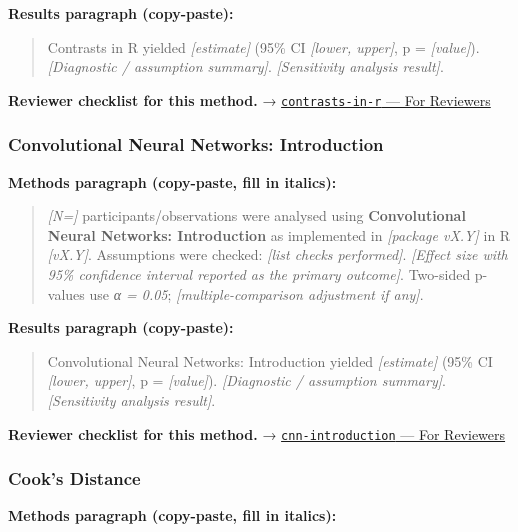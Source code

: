 \documentclass[
]{article}
\begin{document}
\textbf{Results paragraph (copy-paste):}

\begin{quote}
Contrasts in R yielded \emph{{[}estimate{]}} (95\% CI \emph{{[}lower,
upper{]}}, p = \emph{{[}value{]}}). \emph{{[}Diagnostic / assumption
summary{]}}. \emph{{[}Sensitivity analysis result{]}}.
\end{quote}

\textbf{Reviewer checklist for this method.} →
\href{../chapters/07-regression/contrasts-in-r.Rmd\#for-reviewers}{\texttt{contrasts-in-r}
--- For Reviewers}

\subsubsection{Convolutional Neural Networks:
Introduction}\label{convolutional-neural-networks-introduction}

\textbf{Methods paragraph (copy-paste, fill in italics):}

\begin{quote}
\emph{{[}N={]}} participants/observations were analysed using
\textbf{Convolutional Neural Networks: Introduction} as implemented in
\emph{{[}package vX.Y{]}} in R \emph{{[}vX.Y{]}}. Assumptions were
checked: \emph{{[}list checks performed{]}}. \emph{{[}Effect size with
95\% confidence interval reported as the primary outcome{]}}. Two-sided
p-values use \emph{α = 0.05}; \emph{{[}multiple-comparison adjustment if
any{]}}.
\end{quote}

\textbf{Results paragraph (copy-paste):}

\begin{quote}
Convolutional Neural Networks: Introduction yielded
\emph{{[}estimate{]}} (95\% CI \emph{{[}lower, upper{]}}, p =
\emph{{[}value{]}}). \emph{{[}Diagnostic / assumption summary{]}}.
\emph{{[}Sensitivity analysis result{]}}.
\end{quote}

\textbf{Reviewer checklist for this method.} →
\href{../chapters/13-ml/cnn-introduction.Rmd\#for-reviewers}{\texttt{cnn-introduction}
--- For Reviewers}

\subsubsection{Cook's Distance}\label{cooks-distance}

\textbf{Methods paragraph (copy-paste, fill in italics):}
\end{document}
